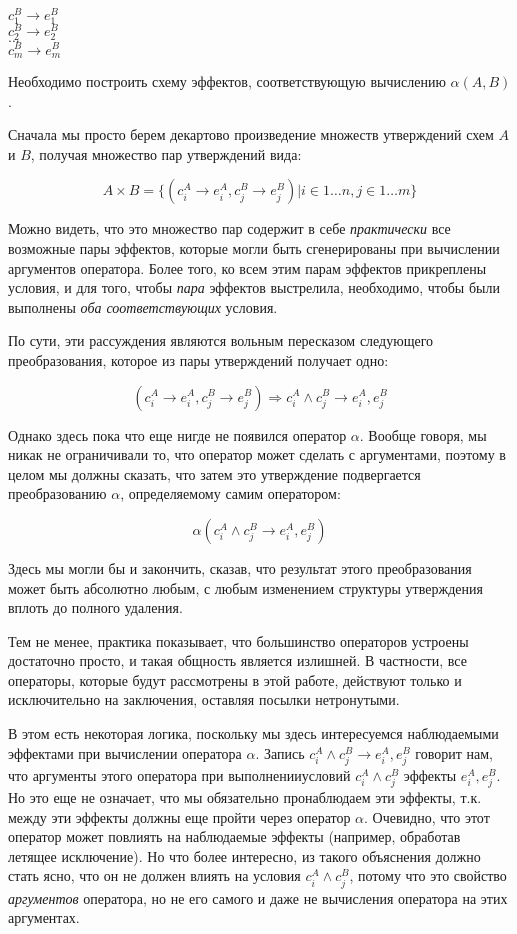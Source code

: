\bigskip

{
    $c^B_1 \rightarrow e^B_1$ \\
    $c^B_2 \rightarrow e^B_2$ \\
    $\ldots$ \\
    $c^B_m \rightarrow e^B_m$ \\        
}{}

Необходимо построить схему эффектов, соответствующую вычислению $\alpha(A, B)$. 



Сначала мы просто берем декартово произведение множеств утверждений схем $A$ и $B$, получая множество пар утверждений вида: 

$$A \times B = \big\{ (c^A_i \rightarrow e^A_i, c^B_j \rightarrow e^B_j) \rvert i \in 1 \ldots n, j \in 1 \ldots m \big\}$$

Можно видеть, что это множество пар содержит в себе \emph{практически} все возможные пары эффектов, которые могли быть сгенерированы при вычислении аргументов оператора. Более того, ко всем этим парам эффектов прикреплены условия, и для того, чтобы \emph{пара} эффектов выстрелила, необходимо, чтобы были выполнены \emph{оба соответствующих} условия. 

По сути, эти рассуждения являются вольным пересказом следующего преобразования, которое из пары утверждений получает одно:

$$ (c^A_i \rightarrow e^A_i, c^B_j \rightarrow e^B_j) \Rightarrow c^A_i \land c^B_j \rightarrow e^A_i, e^B_j $$

Однако здесь пока что еще нигде не появился оператор $\alpha$. Вообще говоря, мы никак не ограничивали то, что оператор может сделать с аргументами, поэтому в целом мы должны сказать, что затем это утверждение подвергается преобразованию $\alpha$, определяемому самим оператором:

$$ \alpha(c^A_i \land c^B_j \rightarrow e^A_i, e^B_j) $$ 

Здесь мы могли бы и закончить, сказав, что результат этого преобразования может быть абсолютно любым, с любым изменением структуры утверждения вплоть до полного удаления.

Тем не менее, практика показывает, что большинство операторов устроены достаточно просто, и такая общность является излишней. В частности, все операторы, которые будут рассмотрены в этой работе, действуют только и исключительно на заключения, оставляя посылки нетронутыми.

В этом есть некоторая логика, поскольку мы здесь интересуемся наблюдаемыми эффектами при вычислении оператора $\alpha$. Запись $c^A_i \land c^B_j \rightarrow e^A_i, e^B_j$ говорит нам, что аргументы этого оператора при выполненииусловий $c^A_i \land c^B_j$ эффекты $e^A_i, e^B_j$. Но это еще не означает, что мы обязательно пронаблюдаем эти эффекты, т.к. между эти эффекты должны еще пройти через оператор $\alpha$. Очевидно, что этот оператор может повлиять на наблюдаемые эффекты (например, обработав летящее исключение). Но что более интересно, из такого объяснения должно стать ясно, что он не должен влиять на условия $c^A_i \land c^B_j$, потому что это свойство \emph{аргументов} оператора, но не его самого и даже не вычисления оператора на этих аргументах.

